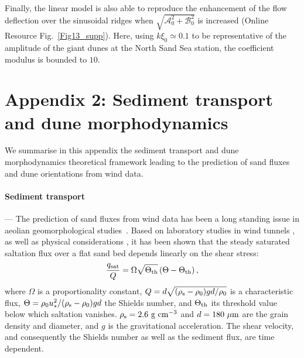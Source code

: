 Finally, the linear model is also able to reproduce the enhancement of the flow deflection over the sinusoidal ridges when $\sqrt{\mathcal{A}_{0}^{2} + \mathcal{B}_{0}^{2}}$ is increased (Online Resource Fig.~\ref{Fig13_supp}). Here, using $k\xi_0 \simeq 0.1$ to be representative of the amplitude of the giant dunes at the North Sand Sea station, the coefficient modulus is bounded to $10$.


\section*{Appendix 2: Sediment transport and dune morphodynamics}
\label{app:app2}

We summarise in this appendix the sediment transport and dune morphodynamics theoretical framework leading to the prediction of sand fluxes and dune orientations from wind data.

\paragraph{Sediment transport} ---
The prediction of sand fluxes from wind data has been a long standing issue in aeolian geomorphological studies~\citep{Fryberger79, Pearce2005, Sherman2012, Shen2019}. Based on laboratory studies in wind tunnels \citep{Rasmussen96, Iversen99, Creyssels2009, Ho2011}, as well as physical considerations \citep{Ungar1987, Andreotti2004bis, Duran2011, Pahtz2020}, it has been shown that the steady saturated saltation flux over a flat sand bed depends linearly on the shear stress:
%
\begin{equation}
\label{transport_law_quadratic}
\frac{q_{\textup{sat}}}{Q} = \Omega\sqrt{\Theta_{\textup{th}}}\left(\Theta - \Theta_{\textup{th}}\right),
\end{equation}
%
where $\Omega$ is a proportionality constant, $Q = d\sqrt{(\rho_{\textup{s}} - \rho_{0})gd/\rho_{0}}$ is a characteristic flux, $\Theta = \rho_{0} u_{*}^{2}/(\rho_{\textup{s}} - \rho_{0})gd$ the Shields number, and $\Theta_{\textup{th}}$ its threshold value below which saltation vanishes. $\rho_{\textup{s}} = 2.6~\textup{g}~\textup{cm}^{-3}$ and $d=180~\mu\textup{m}$ are the grain density and diameter, and $g$ is the gravitational acceleration. The shear velocity, and consequently the Shields number as well as the sediment flux, are time dependent.


